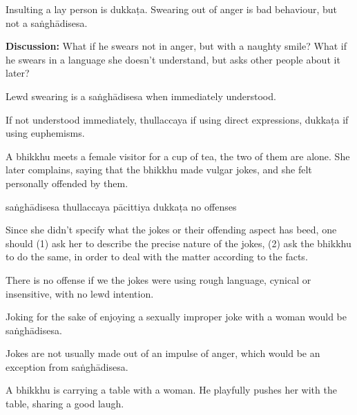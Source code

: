 \begin{exam}{\autoExamName}
\begin{problem*}
\begin{parts}
    \begin{solution}
      Insulting a lay person is dukkaṭa.
      Swearing out of anger is bad behaviour, but not a saṅghādisesa.
    \end{solution}

    \bigskip

    \textbf{Discussion:} What if he swears not in anger, but with a naughty
    smile? What if he swears in a language she doesn't understand, but asks
    other people about it later?

    \begin{solution}
      Lewd swearing is a saṅghādisesa when immediately understood.

      If not understood immediately, thullaccaya if using direct expressions, dukkaṭa if using euphemisms.
    \end{solution}

    \bigskip

  \item A bhikkhu meets a female visitor for a cup of tea, the two of them are alone.
  She later complains, saying that the bhikkhu made vulgar jokes,
  and she felt personally offended by them.

    \bigskip

    \begin{answers}{5}
      \bChoices
       saṅghādisesa\eAns
       thullaccaya\eAns
       pācittiya\eAns
       dukkaṭa\eAns
       no offenses\eAns
      \eChoices
    \end{answers}

    \begin{solution}
      Since she didn't specify what the jokes or their offending aspect has beed,
      one should (1) ask her to describe the precise nature of the jokes,
      (2) ask the bhikkhu to do the same,
      in order to deal with the matter according to the facts.

      There is no offense if we the jokes were using
      rough language, cynical or insensitive, with no lewd intention.

      Joking for the sake of enjoying a sexually improper joke with a woman would be saṅghādisesa.

      Jokes are not usually made out of an impulse of anger, which would be an exception from saṅghādisesa.
    \end{solution}

    \bigskip

  \item A bhikkhu is carrying a table with a woman. He playfully pushes her
    with the table, sharing a good laugh.


\end{parts}
\end{problem*}
\end{exam}
